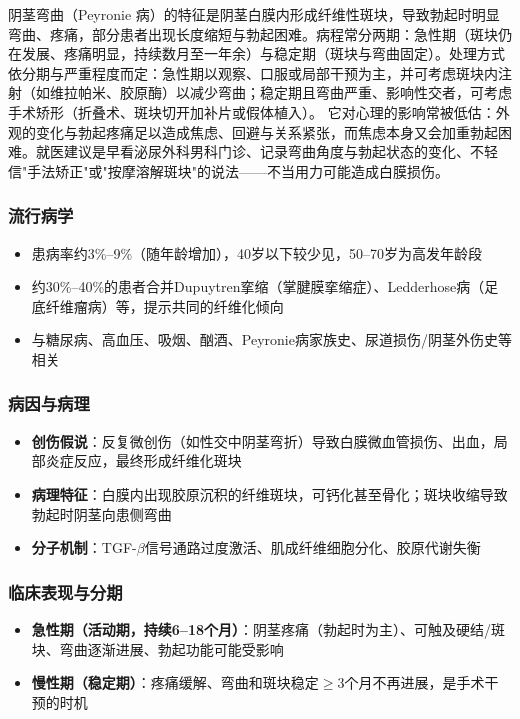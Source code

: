 \documentclass[12pt,a4paper,twoside]{ctexbook}
\begin{document}
阴茎弯曲（Peyronie 病）的特征是阴茎白膜内形成纤维性斑块，导致勃起时明显弯曲、疼痛，部分患者出现长度缩短与勃起困难。病程常分两期：急性期（斑块仍在发展、疼痛明显，持续数月至一年余）与稳定期（斑块与弯曲固定）。处理方式依分期与严重程度而定：急性期以观察、口服或局部干预为主，并可考虑斑块内注射（如维拉帕米、胶原酶）以减少弯曲；稳定期且弯曲严重、影响性交者，可考虑手术矫形（折叠术、斑块切开加补片或假体植入）。
它对心理的影响常被低估：外观的变化与勃起疼痛足以造成焦虑、回避与关系紧张，而焦虑本身又会加重勃起困难。就医建议是早看泌尿外科男科门诊、记录弯曲角度与勃起状态的变化、不轻信"手法矫正"或"按摩溶解斑块"的说法——不当用力可能造成白膜损伤。

\subsubsection{流行病学}

\begin{itemize}[leftmargin=2cm]
	\item 患病率约3\%--9\%（随年龄增加），40岁以下较少见，50--70岁为高发年龄段
	\item 约30\%--40\%的患者合并Dupuytren挛缩（掌腱膜挛缩症）、Ledderhose病（足底纤维瘤病）等，提示共同的纤维化倾向
	\item 与糖尿病、高血压、吸烟、酗酒、Peyronie病家族史、尿道损伤/阴茎外伤史等相关
\end{itemize}

\subsubsection{病因与病理}

\begin{itemize}[leftmargin=2cm]
	\item \textbf{创伤假说}：反复微创伤（如性交中阴茎弯折）导致白膜微血管损伤、出血，局部炎症反应，最终形成纤维化斑块
	\item \textbf{病理特征}：白膜内出现胶原沉积的纤维斑块，可钙化甚至骨化；斑块收缩导致勃起时阴茎向患侧弯曲
	\item \textbf{分子机制}：TGF-$\beta$信号通路过度激活、肌成纤维细胞分化、胶原代谢失衡
\end{itemize}

\subsubsection{临床表现与分期}

\begin{itemize}[leftmargin=2cm]
	\item \textbf{急性期（活动期，持续6--18个月）}：阴茎疼痛（勃起时为主）、可触及硬结/斑块、弯曲逐渐进展、勃起功能可能受影响
	\item \textbf{慢性期（稳定期）}：疼痛缓解、弯曲和斑块稳定$\ge$3个月不再进展，是手术干预的时机
\end{itemize}
\end{document}
